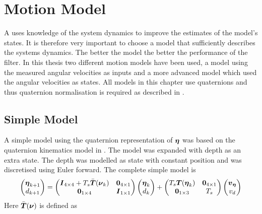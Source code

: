 \section{Motion Model}
A \abbrKF uses knowledge of the system dynamics to improve the estimates of the model's states. It is therefore very important to choose a model that sufficiently describes the systems dynamics. The better the model the better the performance of the filter. In this thesis two different motion models have been used, a model using the measured angular velocities as inputs and a more advanced model which used the angular velocities as states. All models in this chapter use quaternions and thus quaternion normalisation is required as described in .

\subsection{Simple Model}\label{sec:simple_model}
A simple model using the quaternion representation of $\boldsymbol{\eta}$ was based on the quaternion kinematics model in \citet[p.47]{Tornqvist}. The model was expanded with depth as an extra state. The depth was modelled as state with constant position and was discretised using Euler forward. The complete simple model is 
\begin{equation}
\begin{pmatrix}
\boldsymbol{\eta}_{k+1}\\
d_{k+1}
\end{pmatrix} 
=
 \begin{pmatrix}
 \boldsymbol{I}_{4\times4} + T_s \bar{\boldsymbol{T}}(\boldsymbol{\nu}_k) & \boldsymbol{0}_{4\times1}\\
 \boldsymbol{0}_{1\times4} & \boldsymbol{I}_{1\times1} 
 \end{pmatrix}
 \begin{pmatrix}
 \boldsymbol{\eta}_{k}\\
 d_k
 \end{pmatrix}
 +
  \begin{pmatrix}
  T_s \boldsymbol{T}(\boldsymbol{\eta}_{k}) & \boldsymbol{0}_{4\times1}\\
  \boldsymbol{0}_{1\times3} & T_s
  \end{pmatrix}
  \begin{pmatrix}
  \boldsymbol{v}_{\boldsymbol{\eta}}\\
  v_d 
  \end{pmatrix}
\end{equation}
Here $\bar{\boldsymbol{T}}(\boldsymbol{\nu})$ is defined as
